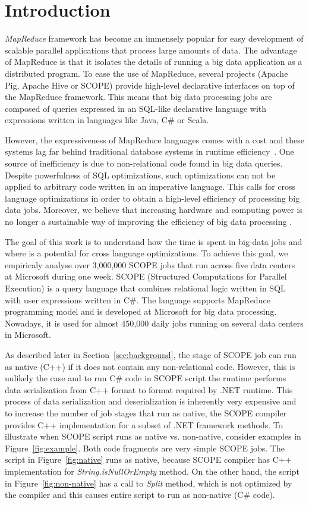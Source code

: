 \section{Introduction}
\emph{MapReduce} framework has become an immensely popular for easy development of scalable parallel applications that process large amounts of data. 
The advantage of MapReduce is that it isolates the details of running a big data application as a distributed program. 
To ease the use of MapReduce, several projects (Apache Pig, Apache Hive or SCOPE) provide high-level declarative interfaces on top of the MapReduce framework. 
This means that big data processing jobs are composed of queries expressed in an SQL-like declarative language with expressions written in languages like Java, C\# or Scala.

However, the expressiveness of MapReduce languages comes with a cost and these systems lag far behind traditional database systems in runtime efficiency~\cite{Jahani:2011,Pavlo:2009}.
One source of inefficiency is due to non-relational code found in big data queries. 
Despite powerfulness of SQL optimizations, such optimizations can not be applied to arbitrary code written in an imperative language.
This calls for cross language optimizations in order to obtain a high-level efficiency of processing big data jobs.
Moreover, we believe that increasing hardware and computing power is no longer a sustainable way of improving the efficiency of big data processing . 

The goal of this work is to understand how the time is spent in big-data jobs and where is a potential for cross language optimizations.
To achieve this goal, we empiricaly analyse over 3,000,000 SCOPE jobs that run across five data centers at Microsoft during one week. 
SCOPE (Structured Computations for Parallel Execution) is a query language that combines relational logic written in SQL with user expressions written in C\#.
The language supports MapReduce programming model and is developed at Microsoft for big data processing. 
Nowadays, it is used for almost 450,000 daily jobs running on several data centers in Microsoft.

As described later in Section~\ref{sec:background}, the stage of SCOPE job can run as native (C++) if it does not contain any non-relational code. 
However, this is unlikely the case and to run C\# code in SCOPE script the runtime performs data serialization from C++ format to format required by .NET runtime. 
This process of data serialization and deserialization is inherently very expensive and to increase the number of job stages that run as native, the SCOPE compiler provides C++ implementation for a subset of .NET framework methods. 
To illustrate when SCOPE script runs as native vs. non-native, consider examples in Figure~\ref{fig:example}. 
Both code fragments are very simple SCOPE jobs. 
The script in Figure~\ref{fig:native} runs as native, because SCOPE compiler has C++ implementation for \emph{String.isNullOrEmpty} method. On the other hand, the script in Figure~\ref{fig:non-native} has a call to \emph{Split} method, which is not optimized by the compiler and this causes entire script to run as non-native (C\# code).

